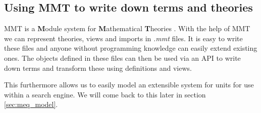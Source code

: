 

\subsection{Using MMT to write down terms and theories}

MMT is a \textbf{M}odule system for \textbf{M}athematical \textbf{T}heories \cite{RabKoh:WSMSML13}. With the help of MMT we can represent theories, views and imports in \textit{.mmt} files. It is easy to write these files and anyone without programming knowledge can easily extend existing ones. The objects defined in these files can then be used via an API to write down terms and transform these using definitions and views.

This furthermore allows us to easily model an extensible system for units for use within a search engine. We will come back to this later in section \ref{sec:meq_model}.
